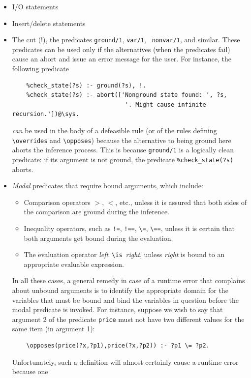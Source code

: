 \documentclass[11pt]{article}
\newcommand{\bs}{\textbackslash}
\begin{document}
\begin{itemize}
\item  I/O statements
\item  Insert/delete statements
\item  The cut (!), the predicates {\tt ground/1}, {\tt var/1}, {\tt
    nonvar/1}, and similar.
  These predicates can be used only if the alternatives (when
  the predicates fail) cause an abort and issue an error message for the user.
  For instance, the following predicate
\begin{verbatim}
    %check_state(?s) :- ground(?s), !.
    %check_state(?s) :- abort(['Nonground state found: ', ?s,
                                '. Might cause infinite recursion.'])@\sys.  
\end{verbatim}
  \emph{can} be used in the body of a defeasible rule (or of the rules defining
  {\tt \bs{}overrides} and {\tt \bs{}opposes}) because the alternative to being
  ground here aborts the inference process.
  This is because \texttt{ground/1} is a logically clean predicate: if its
  argument is not ground, the predicate \texttt{\%check\_state(?s)} aborts.  
\item \emph{Modal} predicates that require bound arguments, which include:
  \begin{itemize}
  \item  Comparison operators $>$, $<$, etc.,
    unless it is assured that both sides of the
    comparison are ground during the inference.
  \item  Inequality operators, such as {\tt !=}, {\tt !==}, \verb|\=|,
    \verb|\==|,  unless it is certain that both arguments get bound during
    the evaluation.
  \item  The evaluation operator \emph{left}~\texttt{\bs{}is}~\emph{right},
    unless \emph{right} is bound to an appropriate evaluable expression.  
  \end{itemize}
  In all these cases, a general remedy in case of a runtime error
  that complains about unbound arguments
  is to identify the appropriate
  domain for the variables that must be bound and bind the variables in
  question before the modal predicate is invoked. For instance, suppose we
  wish to say that argument 2 of the predicate \texttt{price}  
  must not have two different values for the same item (in argument 1):
\begin{verbatim}
    \opposes(price(?x,?p1),price(?x,?p2)) :- ?p1 \= ?p2.
\end{verbatim}
  Unfortunately, such a definition will almost certainly cause a runtime error because one

\end{itemize}
\end{document}
